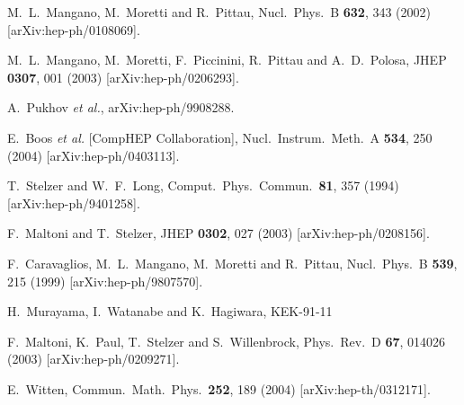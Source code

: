 \documentclass[12pt]{iopart}
\begin{document}
\begin{thebibliography}{99}
  M.~L.~Mangano, M.~Moretti and R.~Pittau,
  Nucl.\ Phys.\ B {\bf 632}, 343 (2002)
  [arXiv:hep-ph/0108069].

  M.~L.~Mangano, M.~Moretti, F.~Piccinini, R.~Pittau and A.~D.~Polosa,
  JHEP {\bf 0307}, 001 (2003)
  [arXiv:hep-ph/0206293].

  A.~Pukhov {\it et al.},
  arXiv:hep-ph/9908288.

  E.~Boos {\it et al.}  [CompHEP Collaboration],
  Nucl.\ Instrum.\ Meth.\ A {\bf 534}, 250 (2004)
  [arXiv:hep-ph/0403113].
  
  T.~Stelzer and W.~F.~Long,
  Comput.\ Phys.\ Commun.\  {\bf 81}, 357 (1994)
  [arXiv:hep-ph/9401258].

  F.~Maltoni and T.~Stelzer,
  JHEP {\bf 0302}, 027 (2003)
  [arXiv:hep-ph/0208156].

  F.~Caravaglios, M.~L.~Mangano, M.~Moretti and R.~Pittau,
  Nucl.\ Phys.\ B {\bf 539}, 215 (1999)
  [arXiv:hep-ph/9807570].

  H.~Murayama, I.~Watanabe and K.~Hagiwara,
KEK-91-11

  F.~Maltoni, K.~Paul, T.~Stelzer and S.~Willenbrock,
  Phys.\ Rev.\ D {\bf 67}, 014026 (2003)
  [arXiv:hep-ph/0209271].

  E.~Witten,
  Commun.\ Math.\ Phys.\  {\bf 252}, 189 (2004)
  [arXiv:hep-th/0312171].


\end{thebibliography}
\end{document}
